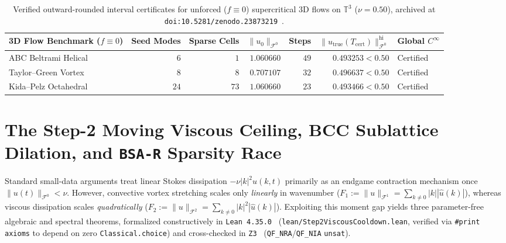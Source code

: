 \documentclass[11pt]{article}
\theoremstyle{plain}
\theoremstyle{definition}
\begin{document}
\begin{table}[htbp]
\centering
\caption{Verified outward-rounded interval certificates for unforced ($f \equiv 0$) supercritical 3D flows on $\mathbb{T}^3$ ($\nu = 0.50$), archived at \texttt{doi:10.5281/zenodo.23873219}~\cite{duguay2026zenodo}.}\label{tab:certs}
\vspace{4pt}
\begin{tabular}{@{}lrrrrrl@{}}
\toprule
3D Flow Benchmark ($f \equiv 0$) & Seed Modes & Sparse Cells & $\|u_0\|_{\mathcal{F}^0}$ & Steps & $\|u_{\mathrm{true}}(T_{\mathrm{cert}})\|_{\mathcal{F}^0}^{\mathrm{hi}}$ & Global $C^\infty$ \\
\midrule
ABC Beltrami Helical       & $6$  & $1$  & $1.060660$ & $49$ & $0.493253 < 0.50$ & Certified \\
Taylor--Green Vortex       & $8$  & $8$  & $0.707107$ & $32$ & $0.496637 < 0.50$ & Certified \\
Kida--Pelz Octahedral      & $24$ & $73$ & $1.060660$ & $23$ & $0.493466 < 0.50$ & Certified \\
\bottomrule
\end{tabular}
\end{table}

\section{The Step-2 Moving Viscous Ceiling, BCC Sublattice Dilation, and \texttt{BSA-R} Sparsity Race}\label{sec:step2}

Standard small-data arguments treat linear Stokes dissipation $-\nu |k|^2 \hat{u}(k,t)$ primarily as an endgame contraction mechanism once $\|u(t)\|_{\mathcal{F}^0} < \nu$. However, convective vortex stretching scales only \emph{linearly} in wavenumber ($F_1 := \|u\|_{\mathcal{F}^1} = \sum_{k \neq 0} |k||\hat{u}(k)|$), whereas viscous dissipation scales \emph{quadratically} ($F_2 := \|u\|_{\mathcal{F}^2} = \sum_{k \neq 0} |k|^2|\hat{u}(k)|$). Exploiting this moment gap yields three parameter-free algebraic and spectral theorems, formalized constructively in \texttt{Lean 4.35.0}~\cite{lean4_2021} (\texttt{lean/Step2ViscousCooldown.lean}, verified via \texttt{\#print axioms} to depend on zero \texttt{Classical.choice}) and cross-checked in \texttt{Z3}~\cite{z3_2008} (\texttt{QF\_NRA}/\texttt{QF\_NIA} \texttt{unsat}).
\end{document}
